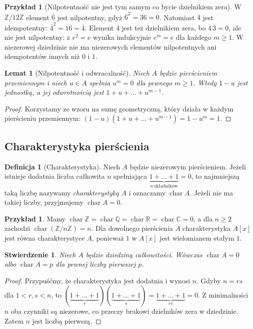 \documentclass[11pt,a4paper,openany]{report}
\numberwithin{equation}{section}
\theoremstyle{plain}
\newtheorem{lemat}[twierdzenie]{Lemat}
\newtheorem{stwierdzenie}[twierdzenie]{Stwierdzenie}
\theoremstyle{definition}
\newtheorem{definicja}[twierdzenie]{Definicja}
\newtheorem{przyklad}[twierdzenie]{Przykład}
\theoremstyle{remark}
\newcommand{\Z}{\mathbb Z}
\newcommand{\Q}{\mathbb Q}
\newcommand{\R}{\mathbb R}
\newcommand{\C}{\mathbb C}
\begin{document}
\begin{przyklad}[Nilpotentność nie jest tym samym co bycie dzielnikiem zera]
W $\Z/12\Z$ element $\overline6$ jest nilpotentny,
gdyż $\overline6^2=\overline{36}=0$.
Natomiast $\overline4$ jest idempotentny:
$\overline4^2=\overline{16}=\overline4$.
Element $\overline4$ jest też dzielnikiem zera, bo
$\overline4\,\overline3=0$, ale nie jest nilpotentny:
z $e^2=e$ wynika indukcyjnie $e^m=e$ dla każdego $m\ge1$.
W niezerowej dziedzinie nie ma niezerowych elementów nilpotentnych
ani idempotentów innych niż $0$ i $1$.
\end{przyklad}

\begin{lemat}[Nilpotentność i odwracalność]
Niech $A$ będzie pierścieniem przemiennym i niech $u\in A$ spełnia
$u^m=0$ dla pewnego $m\ge1$. Wtedy $1-u$ jest jednostką, a jej
odwrotnością jest $1+u+\dots+u^{m-1}$.
\end{lemat}
\begin{proof}
Korzystamy ze wzoru na sumę geometryczną, który działa w każdym
pierścieniu przemiennym:
$(1-u)(1+u+\dots+u^{m-1})=1-u^m=1$.
\end{proof}


\subsection{Charakterystyka pierścienia}

\begin{definicja}[Charakterystyka]
Niech $A$ będzie niezerowym pierścieniem.
Jeżeli istnieje dodatnia liczba całkowita $n$ spełniająca
$\underbrace{1+\dots+1}_{n\ \text{składników}}=0$,
to najmniejszą taką liczbę nazywamy \emph{charakterystyką} $A$
i oznaczamy $\operatorname{char}A$.
Jeżeli nie ma takiej liczby, przyjmujemy $\operatorname{char}A=0$.
\end{definicja}

\begin{przyklad}
Mamy $\operatorname{char}\Z=\operatorname{char}\Q
=\operatorname{char}\R=\operatorname{char}\C=0$,
a dla $n\ge2$ zachodzi $\operatorname{char}(\Z/n\Z)=n$.
Dla dowolnego pierścienia $A$ charakterystyka $A[x]$ jest równa
charakterystyce $A$, ponieważ $1$ w $A[x]$ jest wielomianem stałym $1$.
\end{przyklad}

\begin{stwierdzenie}
Niech $A$ będzie dziedziną całkowitości. Wówczas
$\operatorname{char}A=0$ albo $\operatorname{char}A=p$
dla pewnej liczby pierwszej $p$.
\end{stwierdzenie}
\begin{proof}
Przypuśćmy, że charakterystyka jest dodatnia i wynosi $n$.
Gdyby $n=rs$ dla $1<r,s<n$, to
$(\underbrace{1+\dots+1}_{r})(\underbrace{1+\dots+1}_{s})
=\underbrace{1+\dots+1}_{rs}=0$.
Z minimalności $n$ oba czynniki są niezerowe, co przeczy
brakowi dzielników zera w dziedzinie. Zatem $n$ jest liczbą pierwszą.
\end{proof}
\end{document}
